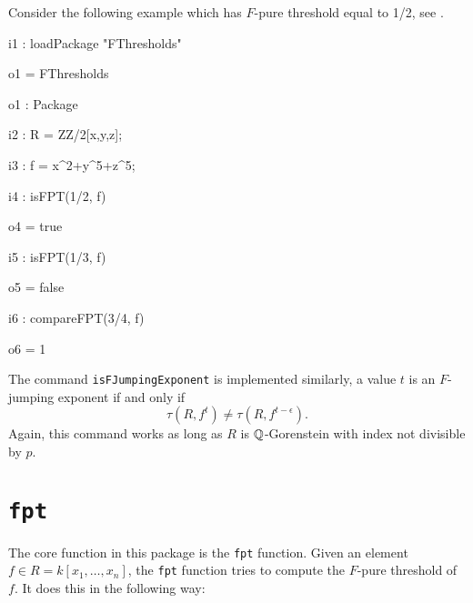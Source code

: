 \documentclass{amsart}
\begin{document}
Consider the following example which has $F$-pure threshold equal to {1/2}, see \cite[Example 4.3]{MustataYoshidaTestIdealVsMultiplierIdeals}.
\medskip
{\small
{}
\begin{MyVerbatim}
i1 : loadPackage "FThresholds"

o1 = FThresholds

o1 : Package

i2 : R = ZZ/2[x,y,z];

i3 : f = x^2+y^5+z^5;

i4 : isFPT(1/2, f)

o4 = true

i5 : isFPT(1/3, f)

o5 = false

i6 : compareFPT(3/4, f)

o6 = 1
\end{MyVerbatim}
}
\medskip

The command {\tt isFJumpingExponent} is implemented similarly, a value $t$ is an $F$-jumping exponent if and only if
\[
\tau(R, f^t) \neq \tau(R, f^{t-\epsilon}).  
\]
Again, this command works as long as $R$ is $\mathbb{Q}$-Gorenstein with index not divisible by $p$. 


\section{\tt fpt}
\label{sec.FPT}

The core function in this package is the {\tt fpt} function.  Given an element $f \in R = k[x_1, \dots, x_n]$, the {\tt fpt} function tries to compute the $F$-pure threshold of $f$.  It does this in the following way:

\section{}




\end{document}
